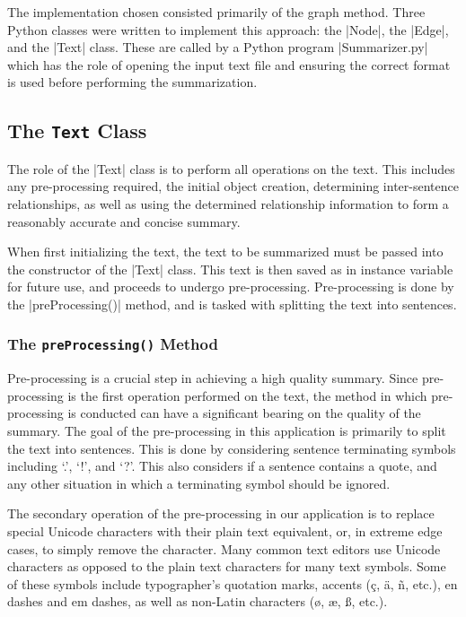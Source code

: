 
The implementation chosen consisted primarily of the graph method. Three Python classes were written to implement this approach: the |Node|, the |Edge|, and the |Text| class. These are called by a Python program |Summarizer.py| which has the role of opening the input text file and ensuring the correct format is used before performing the summarization.


\subsection{The {\tt Text} Class}
	The role of the |Text| class is to perform all operations on the text. This includes any pre-processing required, the initial object creation, determining inter-sentence relationships, as well as using the determined relationship information to form a reasonably accurate and concise summary.
	
	When first initializing the text, the text to be summarized must be passed into the constructor of the |Text| class. This text is then saved as in instance variable for future use, and proceeds to undergo pre-processing. Pre-processing is done by the |preProcessing()| method, and is tasked with splitting the text into sentences.
	
	\subsubsection{The {\tt preProcessing()} Method}
		Pre-processing is a crucial step in achieving a high quality summary. Since pre-processing is the first operation performed on the text, the method in which pre-processing is conducted can have a significant bearing on the quality of the summary. The goal of the pre-processing in this application is primarily to split the text into sentences. This is done by considering sentence terminating symbols including `.', `!', and `?'. This also considers if a sentence contains a quote, and any other situation in which a terminating symbol should be ignored.
		
		The secondary operation of the pre-processing in our application is to replace special Unicode characters with their plain text equivalent, or, in extreme edge cases, to simply remove the character. Many common text editors use Unicode characters as opposed to the plain text characters for many text symbols. Some of these symbols include typographer's quotation marks, accents (\eg \c c, \"a, \~n, etc.), en dashes and em dashes, as well as non-Latin characters (\eg \o, \ae, \ss, etc.). 
		
